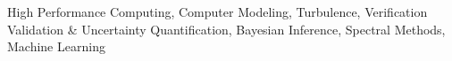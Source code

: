 

High Performance Computing, Computer Modeling, Turbulence,
Verification Validation \& Uncertainty Quantification, Bayesian
Inference, Spectral Methods, Machine Learning

